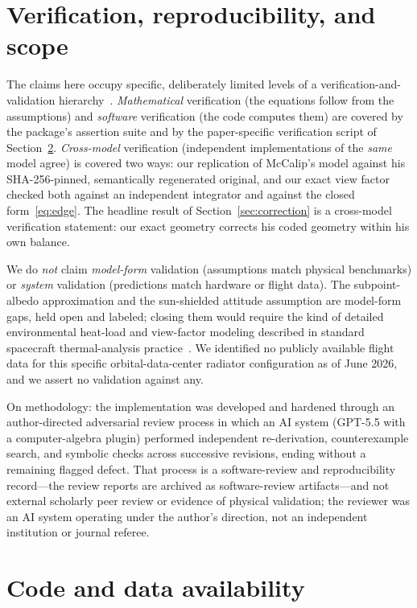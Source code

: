 \documentclass[11pt]{article}
\theoremstyle{remark}
\begin{document}
\section{Verification, reproducibility, and scope}\label{sec:scope}

The claims here occupy specific, deliberately limited levels of a
verification-and-validation hierarchy~\cite{oberkampf}. \emph{Mathematical}
verification (the equations follow from the assumptions) and \emph{software}
verification (the code computes them) are covered by the package's assertion suite
and by the paper-specific verification script of Section~\ref{sec:availability}.
\emph{Cross-model} verification (independent implementations of the \emph{same}
model agree) is covered two ways: our replication of McCalip's model against his
SHA-256-pinned, semantically regenerated original, and our exact view factor
checked both against an independent integrator and against the closed
form~\eqref{eq:edge}. The headline result of Section~\ref{sec:correction} is a
cross-model verification statement: our exact geometry corrects his coded geometry
within his own balance.

We do \emph{not} claim \emph{model-form} validation (assumptions match physical
benchmarks) or \emph{system} validation (predictions match hardware or flight
data). The subpoint-albedo approximation and the sun-shielded attitude assumption
are model-form gaps, held open and labeled; closing them would require the kind of
detailed environmental heat-load and view-factor modeling described in standard
spacecraft thermal-analysis practice~\cite{nasaguidebook}. We identified no publicly available
flight data for this specific orbital-data-center radiator configuration as of June
2026, and we assert no validation against any.

On methodology: the implementation was developed and hardened through an
author-directed adversarial review process in which an AI system (GPT-5.5 with a
computer-algebra plugin) performed independent re-derivation, counterexample
search, and symbolic checks across successive revisions, ending without a
remaining flagged defect. That process is a software-review and reproducibility
record---the review reports are archived as software-review artifacts---and not
external scholarly peer review or evidence of physical validation; the reviewer
was an AI system operating under the author's direction, not an independent
institution or journal referee.

\section{Code and data availability}\label{sec:availability}
\end{document}
